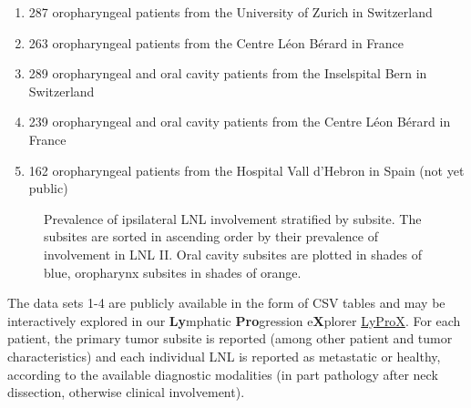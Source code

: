 \documentclass[11pt,twocolumn,twoside]{article}
\providecommand{\tightlist}{%
  \setlength{\itemsep}{0pt}\setlength{\parskip}{0pt}}\usepackage{longtable,booktabs,array}
\begin{document}
\begin{enumerate}
\def\labelenumi{\arabic{enumi}.}
\tightlist
\item
  287 oropharyngeal patients from the University of Zurich in
  Switzerland
\item
  263 oropharyngeal patients from the Centre Léon Bérard in France
\item
  289 oropharyngeal and oral cavity patients from the Inselspital Bern
  in Switzerland
\item
  239 oropharyngeal and oral cavity patients from the Centre Léon Bérard
  in France
\item
  162 oropharyngeal patients from the Hospital Vall d'Hebron in Spain
  (not yet public)
\end{enumerate}

\begin{figure}[b]


\caption{\label{fig-prevalence-by-subsite}Prevalence of ipsilateral LNL
involvement stratified by subsite. The subsites are sorted in ascending
order by their prevalence of involvement in LNL II. Oral cavity subsites
are plotted in shades of blue, oropharynx subsites in shades of orange.}

\end{figure}%

The data sets 1-4 are publicly available in the form of CSV tables
\autocite{ludwig_detailed_2022,ludwig_multi-centric_2023} and may be
interactively explored in our \textbf{Ly}mphatic \textbf{Pro}gression
e\textbf{X}plorer \href{https://lyprox.org}{LyProX}. For each patient,
the primary tumor subsite is reported (among other patient and tumor
characteristics) and each individual LNL is reported as metastatic or
healthy, according to the available diagnostic modalities (in part
pathology after neck dissection, otherwise clinical involvement).
\end{document}
